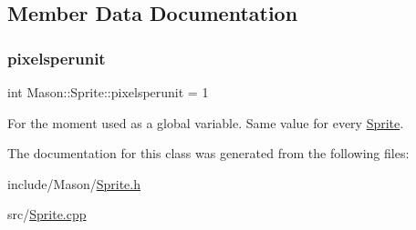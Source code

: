 \subsection{Member Data Documentation}
\hypertarget{class_mason_1_1_sprite_a5d5ba8a72349d94bbe9190efcb9715cc}{}\label{class_mason_1_1_sprite_a5d5ba8a72349d94bbe9190efcb9715cc} 
\subsubsection{\texorpdfstring{pixelsperunit}{pixelsperunit}}
{\footnotesize\ttfamily int Mason\+::\+Sprite\+::pixelsperunit = 1}



For the moment used as a global variable. Same value for every \hyperlink{class_mason_1_1_sprite}{Sprite}. 



The documentation for this class was generated from the following files\+:\begin{DoxyCompactItemize}
\item 
include/\+Mason/\hyperlink{_sprite_8h}{Sprite.\+h}\item 
src/\hyperlink{_sprite_8cpp}{Sprite.\+cpp}\end{DoxyCompactItemize}
